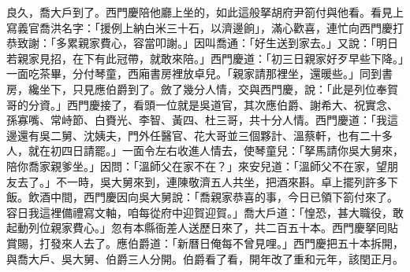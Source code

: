 良久，喬大戶到了。西門慶陪他廳上坐的，如此這般拏胡府尹箚付與他看。看見上寫義官喬洪名字：「援例上納白米三十石，以濟邊餉」，滿心歡喜，連忙向西門慶打恭致謝：「多累親家費心，容當叩謝。」{}因叫喬通：「好生送到家去。」又說：「明日若親家見招，在下有此冠帶，就敢來陪。」西門慶道：「初三日親家好歹早些下降。」一面吃茶畢，分付琴童，西廂書房裡放卓兒。「親家請那裡坐，還暖些。」同到書房，纔坐下，只見應伯爵到了。斂了幾分人情，交與西門慶，說：「此是列位奉賀哥的分資。」西門慶接了，看頭一位就是吳道官，其次應伯爵、謝希大、祝實念、孫寡嘴、常峙節、白賚光、李智、黃四、杜三哥，共十分人情。西門慶道：「我這邊還有吳二舅、沈姨夫，門外任醫官、花大哥並三個夥計、溫蔡軒，也有二十多人，就在初四日請罷。」一面令左右收進人情去，使琴童兒：「拏馬請你吳大舅來，陪你喬家親爹坐。」因問：「溫師父在家不在？」來安兒道：「溫師父不在家，望朋友去了。」不一時，吳大舅來到，連陳敬濟五人共坐，把酒來斟。卓上擺列許多下飯。飲酒中間，西門慶因向吳大舅說：「喬親家恭喜的事，今日已領下箚付來了。容日我這裡備禮寫文軸，咱每從府中迎賀迎賀。」喬大戶道：「惶恐，甚大職役，敢起動列位親家費心。」忽有本縣衙差人送歷日來了，共二百五十本。西門慶拏囘貼賞賜，打發來人去了。應伯爵道：「新曆日俺每不曾見哩。」西門慶把五十本拆開，與喬大戶、吳大舅、伯爵三人分開。伯爵看了看，開年改了重和元年，該閏正月。

